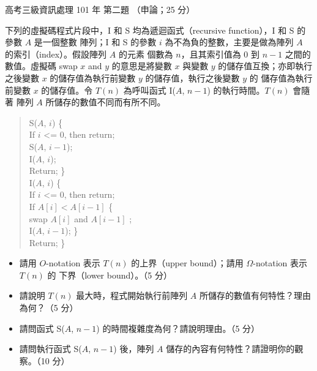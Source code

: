 \begin{pastexam}[label={px:gk3-101-ds-02}]{高考三級資訊處理 101 年 第二題}
（申論；25 分）

下列的虛擬碼程式片段中，I 和 S 均為遞迴函式（recursive function），I 和 S 的參數 $A$ 是一個整數
陣列；I 和 S 的參數 $i$ 為不為負的整數，主要是做為陣列 $A$ 的索引（index）。假設陣列 $A$ 的元素
個數為 $n$，且其索引值為 0 到 $n-1$ 之間的數值。虛擬碼 swap $x$ and $y$ 的意思是將變數 $x$ 與變數
$y$ 的儲存值互換；亦即執行之後變數 $x$ 的儲存值為執行前變數 $y$ 的儲存值，執行之後變數 $y$ 的
儲存值為執行前變數 $x$ 的儲存值。令 $T(n)$ 為呼叫函式 I($A$, $n-1$) 的執行時間。$T(n)$ 會隨著
陣列 $A$ 所儲存的數值不同而有所不同。
\begin{quote}
S($A$, $i$) \{\\
\hspace*{2em}If $i$ <= 0, then return;\\
\hspace*{2em}S($A$, $i - 1$);\\
\hspace*{2em}I($A$, $i$);\\
\hspace*{2em}Return; \}\\
I($A$, $i$) \{\\
\hspace*{2em}If $i$ <= 0, then return;\\
\hspace*{2em}If $A[i] < A[i - 1]$ \{\\
\hspace*{4em}swap $A[i]$ and $A[i - 1]$ ;\\
\hspace*{4em}I($A$, $i - 1$); \}\\
\hspace*{2em}Return; \}
\end{quote}
\begin{itemize}[leftmargin=2em, labelsep=0.3em, itemsep=2pt]
\item[㈠] 請用 $O$-notation 表示 $T(n)$ 的上界（upper bound）；請用 $\Omega$-notation 表示 $T(n)$ 的
下界（lower bound）。（5 分）
\item[㈡] 請說明 $T(n)$ 最大時，程式開始執行前陣列 $A$ 所儲存的數值有何特性？理由為何？（5 分）
\item[㈢] 請問函式 S($A$, $n-1$) 的時間複雜度為何？請說明理由。（5 分）
\item[㈣] 請問執行函式 S($A$, $n-1$) 後，陣列 $A$ 儲存的內容有何特性？請證明你的觀察。（10 分）
\end{itemize}
\end{pastexam}

